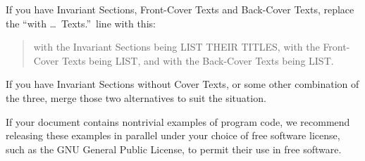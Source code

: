 \documentclass[11pt]{book}
\numberwithin{example}{chapter}
\begin{document}
If you have Invariant Sections, Front-Cover Texts and Back-Cover Texts,
replace the ``with \dots\ Texts.''\ line with this:

\bigskip
\begin{quote}
    with the Invariant Sections being LIST THEIR TITLES, with the
    Front-Cover Texts being LIST, and with the Back-Cover Texts being LIST.
\end{quote}
\bigskip
    
If you have Invariant Sections without Cover Texts, or some other
combination of the three, merge those two alternatives to suit the
situation.

If your document contains nontrivial examples of program code, we
recommend releasing these examples in parallel under your choice of
free software license, such as the GNU General Public License,
to permit their use in free software.


  
\end{document}

